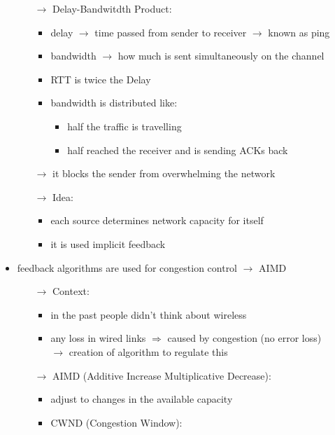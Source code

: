 \begin{itemize}
\begin{itemize}
        \item[$\rightarrow$] Delay-Bandwitdth Product:
        \begin{itemize}
            \item delay $\rightarrow$ time passed from sender to receiver $\rightarrow$ known as ping
            \item bandwidth $\rightarrow$ how much is sent simultaneously on the channel
            \item RTT is twice the Delay
            \item bandwidth is distributed like:
            \begin{itemize}
                \item half the traffic is travelling
                \item half reached the receiver and is sending ACKs back
            \end{itemize}
        \end{itemize}
        \item[$\rightarrow$] it blocks the sender from overwhelming the network
        \item[$\rightarrow$] Idea:
        \begin{itemize}
            \item each source determines network capacity for itself
            \item it is used implicit feedback
        \end{itemize}
    \end{itemize}
    \item feedback algorithms are used for congestion control $\rightarrow$ AIMD
    \begin{itemize}
        \item[$\rightarrow$] Context:
        \begin{itemize}
            \item in the past people didn't think about wireless
            \item any loss in wired links $\Rightarrow$ caused by congestion (no error loss)\\
            $\rightarrow$ creation of algorithm to regulate this
        \end{itemize}
        \item[$\rightarrow$] AIMD (Additive Increase Multiplicative Decrease):
        \begin{itemize}
            \item adjust to changes in the available capacity
            \item CWND (Congestion Window):

\end{itemize}
\end{itemize}
\end{itemize}
